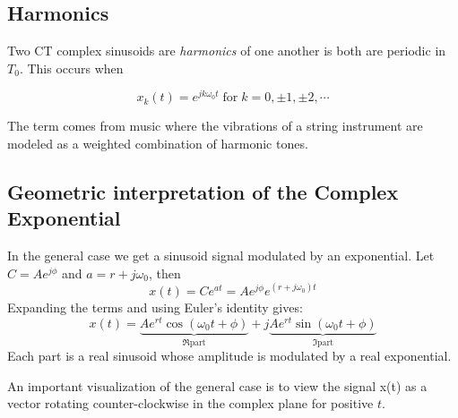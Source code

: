 \subsection{Harmonics}

Two CT complex sinusoids are {\it harmonics} of one another is both are periodic in $T_0$. This occurs when

\[
    x_k(t) = e^{jk\omega_0 t} \; \text{for} \; k = 0, \pm 1, \pm 2, \cdots
\]

The term comes from music where the vibrations of a string instrument are modeled as a weighted combination of harmonic tones. 

\subsection{Geometric interpretation of the Complex Exponential}

In the general case we get a sinusoid signal modulated by an exponential. Let $C = Ae^{j\phi}$ and $a = r + j\omega_0$, then
\[
  x(t) = C e^{a t} =  Ae^{j\phi} e^{(r+j\omega_0)t}
\]
Expanding the terms and using Euler's identity gives:
\[
x(t) = \underbrace{Ae^{rt}\cos(\omega_0 t+\phi)}_{\Re \text{part}} + j \underbrace{Ae^{rt}\sin(\omega_0 t+\phi)}_{\Im \text{part}}
\]
Each part is a real sinusoid whose amplitude is modulated by a real exponential.

An important visualization of the general case is to view the signal x(t) as a vector rotating counter-clockwise in the complex plane for positive $t$.


